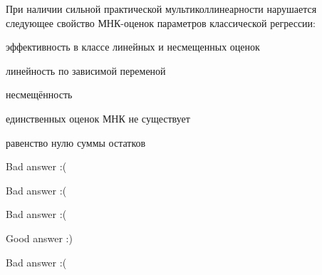 
\begin{question}
При наличии сильной практической мультиколлинеарности нарушается следующее свойство МНК-оценок параметров классической регрессии:
\begin{answerlist}
  \item эффективность в классе линейных и несмещенных оценок
  \item линейность по зависимой переменой
  \item несмещённость
  \item единственных оценок МНК не существует
  \item равенство нулю суммы остатков
\end{answerlist}
\end{question}

\begin{solution}
\begin{answerlist}
  \item Bad answer :(
  \item Bad answer :(
  \item Bad answer :(
  \item Good answer :)
  \item Bad answer :(
\end{answerlist}
\end{solution}

